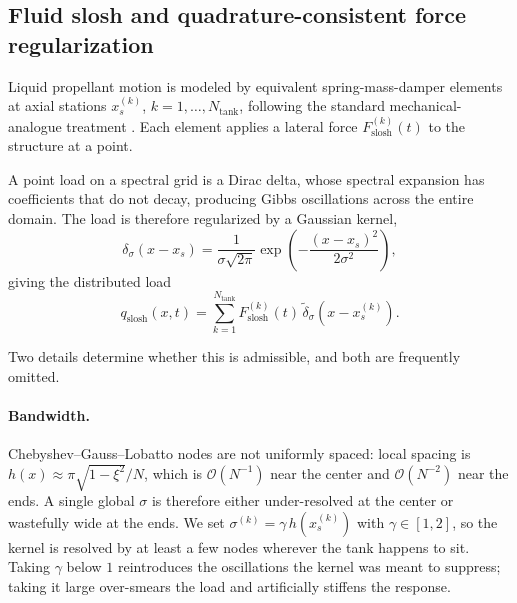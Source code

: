 \documentclass[11pt,a4paper]{article}
\theoremstyle{definition}
\numberwithin{equation}{section}
\begin{document}
\subsection{Fluid slosh and quadrature-consistent force regularization}
\label{sec:slosh}

Liquid propellant motion is modeled by equivalent spring-mass-damper elements at axial stations $x_s^{(k)}$, $k = 1,\dots,N_{\text{tank}}$, following the standard mechanical-analogue treatment \cite{abramson1966, dodge2000, pei2021}. Each element applies a lateral force $F_{\text{slosh}}^{(k)}(t)$ to the structure at a point.

A point load on a spectral grid is a Dirac delta, whose spectral expansion has coefficients that do not decay, producing Gibbs oscillations across the entire domain. The load is therefore regularized by a Gaussian kernel,
\begin{equation}
\label{eq:kernel}
\delta_\sigma(x - x_s) = \frac{1}{\sigma\sqrt{2\pi}} \exp\left( -\frac{(x - x_s)^2}{2\sigma^2} \right),
\end{equation}
giving the distributed load
\begin{equation}
\label{eq:sloshforce}
q_{\text{slosh}}(x,t) = \sum_{k=1}^{N_{\text{tank}}} F_{\text{slosh}}^{(k)}(t)\, \tilde{\delta}_\sigma\!\left(x - x_s^{(k)}\right).
\end{equation}

Two details determine whether this is admissible, and both are frequently omitted.

\paragraph{Bandwidth.} Chebyshev--Gauss--Lobatto nodes are not uniformly spaced: local spacing is $h(x) \approx \pi\sqrt{1-\xi^2}/N$, which is $\mathcal{O}(N^{-1})$ near the center and $\mathcal{O}(N^{-2})$ near the ends. A single global $\sigma$ is therefore either under-resolved at the center or wastefully wide at the ends. We set $\sigma^{(k)} = \gamma\, h(x_s^{(k)})$ with $\gamma \in [1,2]$, so the kernel is resolved by at least a few nodes wherever the tank happens to sit. Taking $\gamma$ below $1$ reintroduces the oscillations the kernel was meant to suppress; taking it large over-smears the load and artificially stiffens the response.
\end{document}

